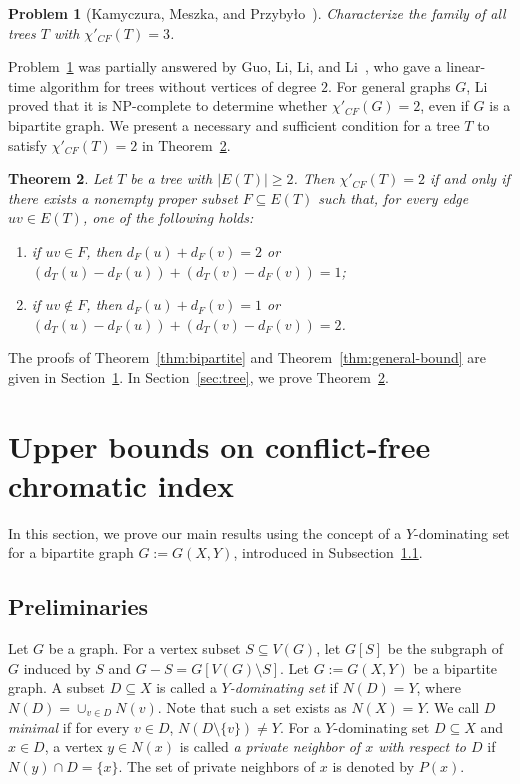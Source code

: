 \documentclass[11pt]{article}
\theoremstyle{plain}
\newtheorem{thm}{Theorem}[section]
\newtheorem{prob}[thm]{Problem}
\numberwithin{equation}{section}
\begin{document}
\begin{prob}[Kamyczura, Meszka, and Przyby{\l}o~\cite{KamyczuraMeszkaPrzybylo2024}]
\label{prob:tree-three}
Characterize the family of all trees $T$ with $\chi'_{CF}(T)=3$.
\end{prob}


Problem~\ref{prob:tree-three} was partially answered by Guo, Li, Li, and Li~\cite{GuoLiLiLi2025}, who gave a linear-time algorithm for trees without vertices of degree $2$. For general graphs $G$, Li~\cite{L2025} proved that it is NP-complete to determine whether $\chi'_{CF}(G)=2$, even if $G$ is a bipartite graph.
We present a necessary and sufficient condition for a tree $T$ to satisfy $\chi'_{CF}(T)=2$ in Theorem~\ref{thm:tree}.

\begin{thm}\label{thm:tree}
Let $T$ be a tree with $|E(T)|\ge 2$. Then $\chi'_{CF}(T)=2$ if and only if
there exists a nonempty proper subset $F\subseteq E(T)$ such that, for every edge
$uv\in E(T)$, one of the following holds:
\begin{enumerate}[label={\rm(\roman*)}]
\item if $uv\in F$, then
$d_F(u)+d_F(v)=2$ or $(d_T(u)-d_F(u))+(d_T(v)-d_F(v))=1$; \label{condition:i}
\item if $uv\notin F$, then
$d_F(u)+d_F(v)=1$ or $(d_T(u)-d_F(u))+(d_T(v)-d_F(v))=2$.\label{condition:ii}
\end{enumerate}
\end{thm}

The proofs of Theorem~\ref{thm:bipartite} and Theorem~\ref{thm:general-bound} are given in Section~\ref{sec:proofbi}. In Section~\ref{sec:tree}, we prove Theorem~\ref{thm:tree}.

\section{Upper bounds on conflict-free chromatic index}\label{sec:proofbi}

In this section, we prove our main results using the concept of a $Y$-dominating set for a bipartite graph $G:=G(X,Y)$, introduced in Subsection~\ref{subsec:pre}.

\subsection{Preliminaries}\label{subsec:pre}

Let $G$ be a graph. For a vertex subset $S\subseteq V(G)$, let $G[S]$ be the subgraph of $G$ induced by $S$ and $G-S=G[V(G)\setminus S]$.
Let $G:=G(X,Y)$ be a bipartite graph. A subset $D\subseteq X$ is called a \emph{$Y$-dominating set} if $N(D)=Y$, where $N(D)=\cup_{v\in D}N(v)$. Note that such a set exists as $N(X)=Y$. We call $D$ \emph{minimal} if for every $v\in D$, $N(D\setminus \{v\})\neq Y$. For a $Y$-dominating set $D\subseteq X$ and $x\in D$, a vertex $y\in N(x)$ is called \emph{a private neighbor of $x$ with respect to $D$} if $N(y)\cap D=\{x\}$.
The set of private neighbors of $x$ is denoted by $P(x)$.
\end{document}
